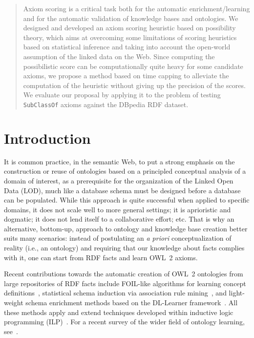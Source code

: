 \documentclass{sig-alternate}
\begin{document}
\maketitle

\begin{abstract}
Axiom scoring is a critical task both for the automatic enrichment/learning
and for the automatic validation of knowledge bases and ontologies.
We designed and developed an axiom scoring heuristic based on possibility theory,
which aims at overcoming some limitations of scoring heuristics based on statistical inference
and taking into account the open-world assumption of the linked data on the Web.
Since computing the possibilistic score can be computationally quite heavy
for some candidate axioms, we propose a method based on time capping
to alleviate the computation of the heuristic without giving up the precision of the scores.
We evaluate our proposal by applying it to the problem of testing \texttt{SubClassOf}
axioms against the DBpedia RDF dataset.
\end{abstract}


\section{Introduction}

It is common practice, in the semantic Web, to put a strong emphasis
on the construction or reuse of ontologies based on a principled conceptual analysis
of a domain of interest, as a prerequisite for the organization of the Linked Open Data (LOD),
much like a database schema must be designed before a database can be populated.
While this approach is quite successful when applied to specific domains,
it does not scale well to more general settings;
it is aprioristic and dogmatic;
it does not lend itself to a collaborative effort; etc.
That is why an alternative, bottom-up, %
approach to ontology and
knowledge base creation better suits many scenarios: instead of postulating an \emph{a priori}
conceptualization of reality (i.e., an ontology) and requiring that our knowledge
about facts complies with it, one can start from RDF facts and learn OWL~2 axioms.

Recent contributions towards the automatic creation of OWL~2 ontologies
from large repositories of RDF facts include
FOIL-like algorithms for learning concept definitions~\cite{FanizziDAmatoEsposito2008},
statistical schema induction via association rule mining~\cite{FleischhackerVoelkerStuckenschmidt2012},
and light-weight schema enrichment methods based on the DL-Learner
framework~\cite{HellmannLehmannAuer2009,BuehmannLehmann2012}.
All these methods apply and extend techniques developed within inductive logic programming
(ILP)~\cite{ILPat20}. For a recent survey of the wider field of ontology learning,
see~\cite{LehmannVoelker2014}.
\end{document}
